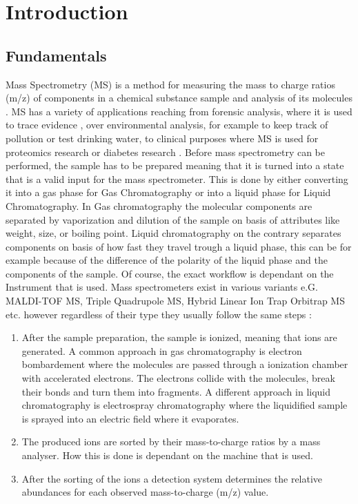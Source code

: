 \documentclass[11pt]{article}
\begin{document}
\section{Introduction}
\subsection{Fundamentals}
Mass Spectrometry (MS) is a method for measuring the mass to charge ratios (m/z) of components in a chemical substance sample and analysis of its molecules \cite{mass-specrometer}. MS has a variety of applications \cite{ms-applications} reaching from forensic analysis, where it is used to trace evidence , over environmental analysis, for example to keep track of pollution or test drinking water, to clinical purposes where MS is used for proteomics research or diabetes research \cite{ms-diabetes}.
Before mass spectrometry can be performed, the sample has to be prepared meaning that it is turned into a state that is a valid input for the mass spectrometer. This is done by either converting it into a gas phase for Gas Chromatography or into a liquid phase for Liquid Chromatography. In Gas chromatography the molecular components are separated by vaporization and dilution of the sample on basis of attributes like weight, size, or boiling point. Liquid chromatography on the contrary separates components on basis of how fast they travel trough a liquid phase, this can be for example because of the difference of the polarity of the liquid phase and the components of the sample. Of course, the exact workflow is dependant on the Instrument that is used. Mass spectrometers exist in various variants e.G. MALDI-TOF MS, Triple Quadrupole MS, Hybrid Linear Ion Trap Orbitrap MS etc.  \cite{mass-specrometer-types} however regardless of their type they usually follow the same steps \cite{mass-specrometer, what-is-mass-spectrometry}:

\begin{enumerate}
\item After the sample preparation, the sample is ionized, meaning that ions are generated. A common approach in gas chromatography is electron bombardement where the molecules are passed through a ionization chamber with accelerated electrons. The electrons collide with the molecules, break their bonds and turn them into fragments. A different approach in liquid
chromatography is electrospray chromatography where the liquidified sample is sprayed into an electric field where it evaporates.
\item The produced ions are sorted by their mass-to-charge ratios by a mass analyser. How this is done is dependant on the machine that is used.
\item After the sorting of the ions a detection system determines the relative abundances for each observed mass-to-charge (m/z) value.
\end{enumerate} 
\end{document}
